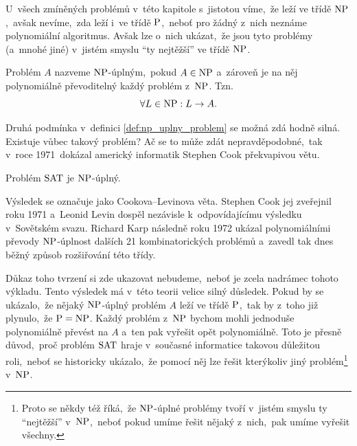 U~všech zmíněných problémů v~této kapitole s~jistotou víme,~že leží ve třídě \ensuremath{\classNP},~avšak nevíme,~zda leží i~ve třídě \ensuremath{\classP},~neboť pro žádný z~nich neznáme polynomiální algoritmus. Avšak lze o~nich ukázat,~že jsou tyto problémy (a~mnohé jiné) v~jistém smyslu ``ty nejtěžší'' ve třídě \ensuremath{\classNP}.
\begin{definition}\label{def:np_uplny_problem}
    Problém $A$ nazveme \ensuremath{\classNP}-úplným,~pokud $A\in\operatorname{NP}$ a~zároveň je na něj polynomiálně převoditelný každý problém z~\ensuremath{\classNP}. Tzn.
    \[\forall L\in\operatorname{NP}: L\rightarrow A.\]
\end{definition}
Druhá podmínka v~definici \ref{def:np_uplny_problem} se možná zdá hodně silná. Existuje vůbec takový problém? Ač se to může zdát nepravděpodobné,~tak v~roce 1971~dokázal americký informatik Stephen Cook překvapivou větu.
\begin{theorem}\label{thm:cook}
    Problém \ensuremath{\SAT} je \ensuremath{\classNP}-úplný.
\end{theorem}
\begin{remark}
    Výsledek se označuje jako Cookova--Levinova věta. Stephen Cook jej zveřejnil roku 1971 a~Leonid Levin dospěl nezávisle k~odpovídajícímu výsledku v~Sovětském svazu. Richard Karp následně roku 1972 ukázal polynomiálními převody \ensuremath{\classNP}-úplnost dalších 21 kombinatorických problémů a~zavedl tak dnes běžný způsob rozšiřování této třídy.
\end{remark}
Důkaz toho tvrzení si zde ukazovat nebudeme,~neboť je zcela nadrámec tohoto výkladu. Tento výsledek má v~této teorii velice silný důsledek. Pokud by se ukázalo,~že nějaký \ensuremath{\classNP}-úplný problém $A$ leží ve třídě \ensuremath{\classP},~tak by z~toho již plynulo,~že $\operatorname{P}=\operatorname{NP}$. Každý problém z~\ensuremath{\classNP} bychom mohli jednoduše polynomiálně převést na $A$ a~ten pak vyřešit opět polynomiálně. Toto je přesně důvod,~proč problém \ensuremath{\SAT} hraje v~současné informatice takovou důležitou roli,~neboť se historicky ukázalo,~že pomocí něj lze řešit kterýkoliv jiný problém\footnote{Proto se někdy též říká,~že \ensuremath{\classNP}-úplné problémy tvoří v~jistém smyslu ty ``nejtěžší'' v~\ensuremath{\classNP},~neboť pokud umíme řešit nějaký z~nich,~pak umíme vyřešit všechny.} v~\ensuremath{\classNP}.

